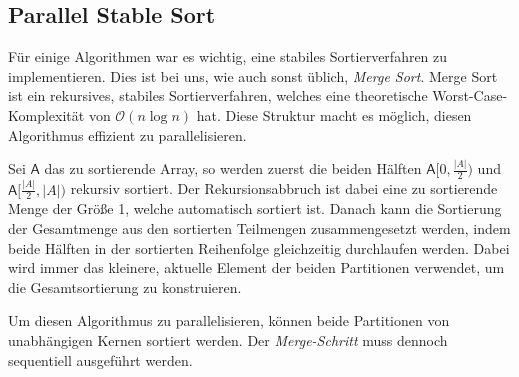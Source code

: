 \subsection{Parallel Stable Sort}
\label{section:stdsort}

Für einige Algorithmen war es wichtig, eine stabiles Sortierverfahren zu implementieren.
Dies ist bei uns, wie auch sonst üblich, \emph{Merge Sort}.
Merge Sort ist ein rekursives, stabiles Sortierverfahren, welches eine theoretische Worst-Case-Komplexität von $\mathcal O (n \log n)$ hat.
Diese Struktur macht es möglich, diesen Algorithmus effizient zu parallelisieren.

Sei $\mathsf A$ das zu sortierende Array, so werden zuerst die beiden
Hälften $\mathsf A[0, \frac{|A|}{2})$ und $\mathsf A[\frac{|A|}{2}, |A|)$ rekursiv sortiert.
Der Rekursionsabbruch ist dabei eine zu sortierende Menge der Größe 1, welche automatisch sortiert ist.
Danach kann die Sortierung der Gesamtmenge aus den sortierten Teilmengen zusammengesetzt werden,
indem beide Hälften in der sortierten Reihenfolge gleichzeitig durchlaufen werden.
Dabei wird immer das kleinere, aktuelle Element der beiden Partitionen verwendet,
um die Gesamtsortierung zu konstruieren.

Um diesen Algorithmus zu parallelisieren,
können beide Partitionen von unabhängigen Kernen sortiert werden.
Der \emph{Merge-Schritt} muss dennoch sequentiell ausgeführt werden.